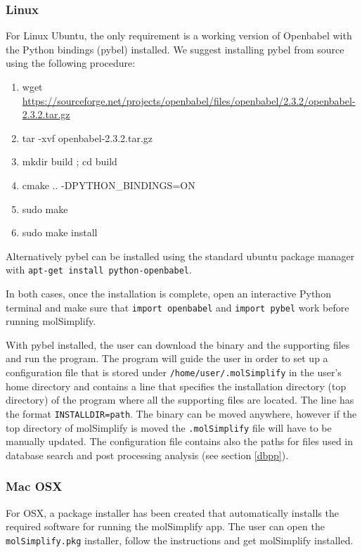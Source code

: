 \documentclass[a4paper,12pt]{assignment}
\begin{document}
\subsubsection{Linux}\label{linbin}

For Linux Ubuntu, the only requirement is a working version of Openbabel with the Python bindings (pybel) installed. We suggest installing pybel from source using the following procedure:
\begin{enumerate}
\item   wget \url{https://sourceforge.net/projects/openbabel/files/openbabel/2.3.2/openbabel-2.3.2.tar.gz}
\item  tar -xvf openbabel-2.3.2.tar.gz 
\item mkdir build ; cd build
\item cmake .. -DPYTHON\_BINDINGS=ON
\item sudo make
\item sudo make install
\end{enumerate}

Alternatively pybel can be installed using the standard ubuntu package manager with \texttt{apt-get install python-openbabel}.

In both cases, once the installation is complete, open an interactive Python terminal and make sure that \texttt{import openbabel} and \texttt{import pybel} work before running molSimplify. 

With pybel installed, the user can download the binary and the supporting files and run the program. The program will guide the user in order to set up a configuration file that is stored under \texttt{/home/user/.molSimplify} in the user's home directory and contains a line that specifies the installation directory (top directory) of the program where all the supporting files are located. The line has the format \texttt{INSTALLDIR=path}. The binary can be moved anywhere, however if the top directory of molSimplify is moved the \texttt{.molSimplify} file will have to be manually updated. The configuration file contains also the paths for files used in database search and post processing analysis (see section \ref{dbpp}).

\subsubsection{Mac OSX}\label{osxbin}

For OSX, a package installer has been created that automatically installs the required software for running the molSimplify app. The user can open the \texttt{molSimplify.pkg} installer, follow the instructions and get molSimplify installed.
\end{document}
